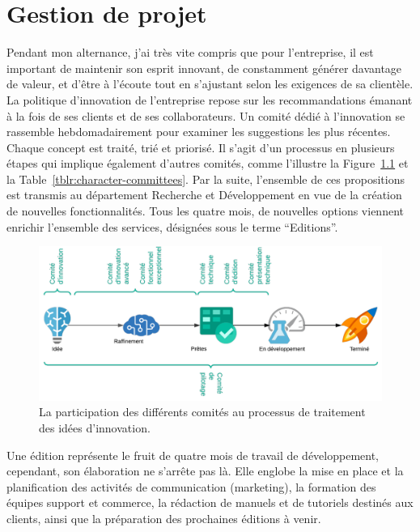 \chapter{Gestion de projet}\label{ch:gestion-projet}

Pendant mon alternance, j'ai très vite compris que pour l'entreprise, il est important de maintenir son esprit innovant, de constamment générer davantage de valeur, et d'être à l'écoute tout en s'ajustant selon les exigences de sa clientèle. La politique d'innovation de l'entreprise repose sur les recommandations émanant à la fois de ses clients et de ses collaborateurs. Un comité dédié à l'innovation se rassemble hebdomadairement pour examiner les suggestions les plus récentes. Chaque concept est traité, trié et priorisé. Il s'agit d'un processus en plusieurs étapes qui implique également d'autres comités, comme l'illustre la Figure~\ref{fig:committees} et la Table~\ref{tblr:character-committees}. Par la suite, l'ensemble de ces propositions est transmis au département Recherche et Développement en vue de la création de nouvelles fonctionnalités. Tous les quatre mois, de nouvelles options viennent enrichir l'ensemble des services, désignées sous le terme ``Editions''.

\begin{figure}[h]
    \centering
    \includegraphics[width=\textwidth]{img/committees}
    \caption{La participation des différents comités au processus de traitement des idées d'innovation.}
    \label{fig:committees}
\end{figure}

Une édition représente le fruit de quatre mois de travail de développement, cependant, son élaboration ne s'arrête pas là. Elle englobe la mise en place et la planification des activités de communication (marketing), la formation des équipes support et commerce, la rédaction de manuels et de tutoriels destinés aux clients, ainsi que la préparation des prochaines éditions à venir.

